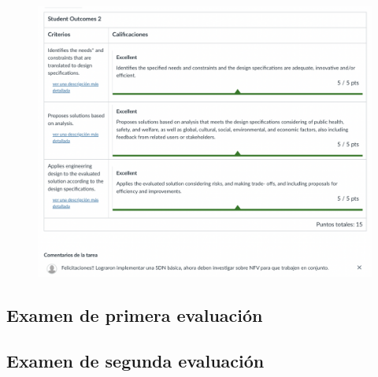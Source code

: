 \begin{figure}[htbp]
    \centering
    \includegraphics[width=\textwidth]{recursos/sdn_ru.png}
\end{figure}



\subsection{Examen de primera evaluación}


\subsection{Examen de segunda evaluación}
